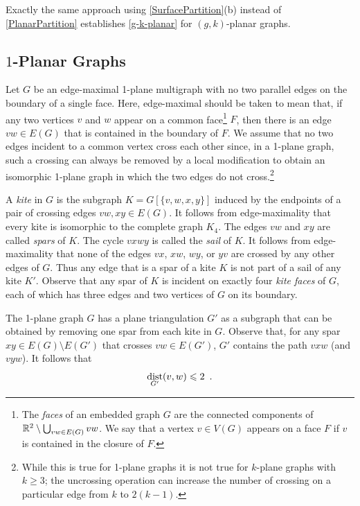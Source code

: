 \documentclass{patmorin}
\DeclareMathOperator{\dist}{dist}
\renewcommand{\ge}{\geqslant}
\renewcommand{\le}{\leqslant}
\begin{document}
Exactly the same approach using \cref{SurfacePartition}(b) instead of \cref{PlanarPartition} establishes 
\cref{g-k-planar} for $(g,k)$-planar graphs. 


\subsection{\boldmath  $1$-Planar Graphs}
\label{sec-1-planar}

Let $G$ be an edge-maximal 1-plane multigraph with no two parallel edges on the boundary of a single face.  Here, edge-maximal should be taken to mean that, if any two vertices $v$ and $w$ appear on a common face\footnote{The \emph{faces} of an embedded graph $G$ are the connected components of $\mathbb{R}^2\setminus \bigcup_{vw\in E(G)} vw$.  We say that a vertex $v\in V(G)$ appears on a face $F$ if $v$ is contained in the closure of $F$.} $F$, then there is an edge $vw\in E(G)$ that is contained in the boundary of $F$.  We assume that no two edges incident to a common vertex cross each other since, in a 1-plane graph, such a crossing can always be removed by a local modification to obtain an isomorphic 1-plane graph in which the two edges do not cross.\footnote{While this is true for 1-plane graphs it is not true for $k$-plane graphs with $k\ge 3$; the uncrossing operation can increase the number of crossing on a particular edge from $k$ to $2(k-1)$.}

A \emph{kite} in $G$ is the subgraph $K=G[\{v,w,x,y\}]$ induced by the endpoints of a pair of crossing edges $vw,xy\in E(G)$.  It follows from edge-maximality that every kite is isomorphic to the complete graph $K_4$.
The edges $vw$ and $xy$ are called \emph{spars} of $K$.  The cycle $vxwy$ is called the \emph{sail} of $K$.  It follows from edge-maximality that none of the edges $vx$, $xw$, $wy$, or $yv$ are crossed by any other edges of $G$. Thus any edge that is a spar of a kite $K$ is not part of a sail of any kite $K'$. Observe that any spar of $K$ is incident on exactly four \emph{kite faces} of $G$, each of which has three edges and two vertices of $G$ on its boundary.

The 1-plane graph $G$ has a plane triangulation $G'$ as a subgraph that can be obtained by removing one spar from each kite in $G$.  Observe that, for any spar $xy\in E(G)\setminus E(G')$ that crosses $vw\in E(G')$, $G'$ contains the path $vxw$ (and $vyw$).  It follows that 
\begin{equation}
  \dist_{G'}(v,w)\le 2 \enspace . \eqlabel{spar-distance}
\end{equation}
\end{document}
